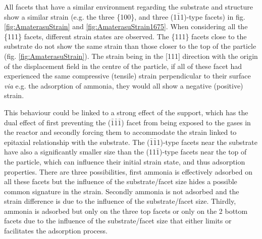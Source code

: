All facets that have a similar environment regarding the substrate and structure show a similar strain (e.g. the three \{100\}, and three (1$\bar{1}$1)-type facets) in fig. \ref{fig:AmaterasuStrain} and \ref{fig:AmaterasuStrain1675}.
When considering all the \{111\} facets, different strain states are observed.
The \{111\} facets close to the substrate do not show the same strain than those closer to the top of the particle (fig. \ref{fig:AmaterasuStrain}).
The strain being in the [111] direction with the origin of the displacement field in the centre of the particle, if all of these facet had experienced the same compressive (tensile) strain perpendicular to their surface \textit{via} e.g. the adsorption of ammonia, they would all show a negative (positive) strain.

This behaviour could be linked to a strong effect of the support, which has the dual effect of first preventing the ($\bar{1}\bar{1}\bar{1}$) facet from being exposed to the gases in the reactor and secondly forcing them to accommodate the strain linked to epitaxial relationship with the substrate.
The ($\bar{1}\bar{1}$1)-type facets near the substrate have also a significantly smaller size than the (11$\bar{1}$)-type facets near the top of the particle, which can influence their initial strain state, and thus adsorption properties.
There are three possibilities, first ammonia is effectively adsorbed on all these facets but the influence of the substrate/facet size hides a possible common signature in the strain.
Secondly ammonia is not adsorbed and the strain difference is due to the influence of the substrate/facet size.
Thirdly, ammonia is adsorbed but only on the three top facets or only on the 2 bottom facets due to the influence of the substrate/facet size that either limits or facilitates the adsorption process.



